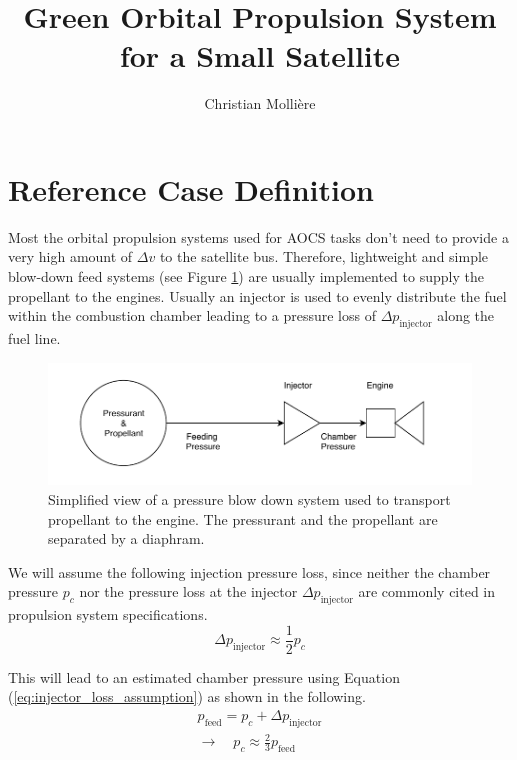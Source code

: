 \documentclass[12pt]{article}
\begin{document}
 
 
\title{Green Orbital Propulsion System for a Small Satellite}
\author{Christian Molli\`ere}
\maketitle
\newpage

\section{Reference Case Definition}
\label{chap:reference_case}
Most the orbital propulsion systems used for AOCS tasks don't need to provide a very high amount of $\Delta v$ to the satellite bus. Therefore, lightweight and simple blow-down feed systems (see Figure \ref{fig:blowdown_system}) are usually implemented to supply the propellant to the engines. Usually an injector is used to evenly distribute the fuel within the combustion chamber leading to a pressure loss of $\Delta p_{\text{injector}}$ along the fuel line.\\

\begin{figure}[!h]
	\centering
	\includegraphics[width=\linewidth]{figures/blowdown_sketch}
	\caption{Simplified view of a pressure blow down system used to transport propellant to the engine. The pressurant and the propellant are separated by a diaphram.}
	\label{fig:blowdown_system}
\end{figure}

We will assume the following injection pressure loss, since neither the chamber pressure $p_c$ nor the pressure loss at the injector $\Delta p_{\text{injector}}$ are commonly cited in propulsion system specifications.
\begin{equation}
	\Delta p_{\text{injector}} \approx \frac{1}{2}p_c 
	\label{eq:injector_loss_assumption}
\end{equation}

This will lead to an estimated chamber pressure using Equation (\ref{eq:injector_loss_assumption}) as shown in the following.
\begin{gather}
	p_{\text{feed}} = p_c + \Delta p_{\text{injector}} \\
	\rightarrow \quad p_c \approx \frac{2}{3} p_{\text{feed}}
	\label{eq:chamber_pressure_estimation}
\end{gather}
\end{document}
